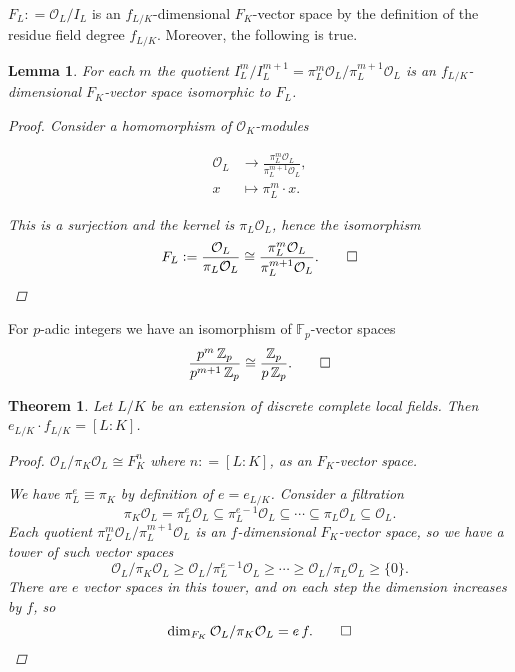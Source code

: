 \documentclass{article}
\newcommand{\isom}{\cong}
\newcommand{\dfn}{\mathrel{\mathop:}=}
\newcommand{\ZZ}{\mathbb{Z}}
\newcommand{\FF}{\mathbb{F}}
\renewcommand{\O}{\mathcal{O}}
\newcommand{\examplesymbol}{$\blacktriangle$}
\renewcommand{\qedsymbol}{$\blacksquare$}
\theoremstyle{myplain}
\newtheorem{lemma}[proposition]{Lemma}
\newtheorem{theorem}[proposition]{Theorem}
\theoremstyle{mydefinition}
\newenvironment{example}
  {\pushQED{\qed}\renewcommand{\qedsymbol}{\examplesymbol}\examplex}
  {\popQED\endexamplex}
\begin{document}
$F_L \dfn \O_L / I_L$ is an $f_{L/K}$-dimensional $F_K$-vector space by the
definition of the residue field degree $f_{L/K}$. Moreover, the following is
true.

\begin{lemma}
  For each $m$ the quotient
  $I_L^m / I_L^{m+1} = \pi_L^m \O_L / \pi_L^{m+1} \O_L$ is an
  $f_{L/K}$-dimensional $F_K$-vector space isomorphic to $F_L$.

  \begin{proof}
    Consider a homomorphism of $\O_K$-modules

    \begin{align*}
      \O_L & \to \frac{\pi_L^m \O_L}{\pi_L^{m+1} \O_L},\\
      x & \mapsto \pi_L^m \cdot x.
    \end{align*}

    This is a surjection and the kernel is $\pi_L \O_L$, hence the isomorphism
    \[ F_L \dfn \frac{\O_L}{\pi_L \O_L} \isom \frac{\pi_L^m \O_L}{\pi_L^{m+1} \O_L}. \qedhere \]
  \end{proof}
\end{lemma}

\begin{example}
  For $p$-adic integers we have an isomorphism of $\FF_p$-vector spaces
  \[ \frac{p^m \, \ZZ_p}{p^{m+1} \, \ZZ_p} \isom \frac{\ZZ_p}{p \, \ZZ_p}. \qedhere \]
\end{example}

\begin{theorem}\label{theorem:efLK}
  Let $L/K$ be an extension of discrete complete local fields. Then
  $e_{L/K}\cdot f_{L/K} = [L:K]$.

  \begin{proof}
    $\O_L / \pi_K \O_L \isom F_K^n$ where $n \dfn [L:K]$, as an $F_K$-vector
    space.

    We have $\pi_L^e \equiv \pi_K$ by definition of $e = e_{L/K}$. Consider a
    filtration
    \[ \pi_K \O_L = \pi_L^e \O_L \subseteq \pi_L^{e-1} \O_L \subseteq \cdots \subseteq \pi_L \O_L \subseteq \O_L. \]
    Each quotient $\pi_L^m \O_L / \pi_L^{m+1} \O_L$ is an $f$-dimensional
    $F_K$-vector space, so we have a tower of such vector spaces
    \[ \O_L / \pi_K \O_L \ge \O_L / \pi_L^{e-1} \O_L \ge \cdots \ge \O_L / \pi_L \O_L \ge \{ 0 \}. \]
    There are $e$ vector spaces in this tower, and on each step the dimension
    increases by $f$, so
    \[ \dim_{F_K} \O_L / \pi_K \O_L = e\,f. \qedhere \]
  \end{proof}
\end{theorem}
\end{document}
